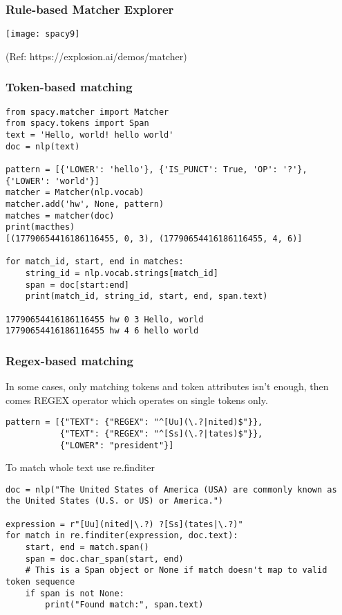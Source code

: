 \begin{frame}[fragile]\frametitle{Rule-based Matcher Explorer}

\begin{center}
\texttt{[image: spacy9]}
\end{center}

{\tiny (Ref: https://explosion.ai/demos/matcher)}
\end{frame}


\begin{frame}[fragile]\frametitle{Token-based matching }

\begin{lstlisting}
from spacy.matcher import Matcher
from spacy.tokens import Span
text = 'Hello, world! hello world'
doc = nlp(text)

pattern = [{'LOWER': 'hello'}, {'IS_PUNCT': True, 'OP': '?'}, {'LOWER': 'world'}]
matcher = Matcher(nlp.vocab)
matcher.add('hw', None, pattern)
matches = matcher(doc)
print(macthes)
[(17790654416186116455, 0, 3), (17790654416186116455, 4, 6)]

for match_id, start, end in matches:
    string_id = nlp.vocab.strings[match_id]
    span = doc[start:end]
    print(match_id, string_id, start, end, span.text)
		
17790654416186116455 hw 0 3 Hello, world
17790654416186116455 hw 4 6 hello world		
\end{lstlisting}
	
\end{frame}

\begin{frame}[fragile]\frametitle{Regex-based matching }

In some cases, only matching tokens and token attributes isn't enough, then comes REGEX operator which  operates on single tokens only. 

\begin{lstlisting}
pattern = [{"TEXT": {"REGEX": "^[Uu](\.?|nited)$"}},
           {"TEXT": {"REGEX": "^[Ss](\.?|tates)$"}},
           {"LOWER": "president"}]
\end{lstlisting}
	
	To match whole text use re.finditer
	
	\begin{lstlisting}
doc = nlp("The United States of America (USA) are commonly known as the United States (U.S. or US) or America.")

expression = r"[Uu](nited|\.?) ?[Ss](tates|\.?)"
for match in re.finditer(expression, doc.text):
    start, end = match.span()
    span = doc.char_span(start, end)
    # This is a Span object or None if match doesn't map to valid token sequence
    if span is not None:
        print("Found match:", span.text)
\end{lstlisting}

\end{frame}

